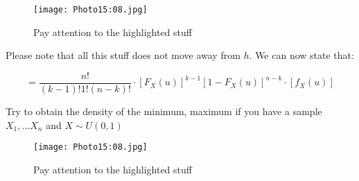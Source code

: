 \begin{figure}
    \centering
    \texttt{[image: Photo15:08.jpg]}
    \caption{Pay attention to the highlighted stuff}
    \label{fig:15_08}
\end{figure}
Please note that all this stuff does not move away from \(h\). We can now state that:

\[ = \frac{n!}{(k-1)!1!(n-k)!} \cdot \left[ F_X (u) \right]^{k-1} \left[ 1-F_X (u) \right]^{n-k} \cdot \left[ f_X(u) \right] \]

\Remark{
    \[\mathbb{P} (X_1, X_2 \in (u, u+h)) = \mathbb{P} (X_1 \in (u, u+h)) \cdot \mathbb{P} (X_2 \in (u, u+h)) = \]
    \[ \left[ f_X(u) h + \sigma (h) \right]^2 = f_X^2 (u) h^2 + f_x(u) h \sigma (h) + \sigma (h)^2 \]
}

Try to obtain the density of the minimum, maximum if you have a sample \(X_1, \ldots X_n\) and \(X \sim U (0,1)\)

\begin{figure}[h]
    \centering
    \texttt{[image: Photo15:08.jpg]}
    \caption{Pay attention to the highlighted stuff}
    \label{fig:enter-label}
\end{figure}
